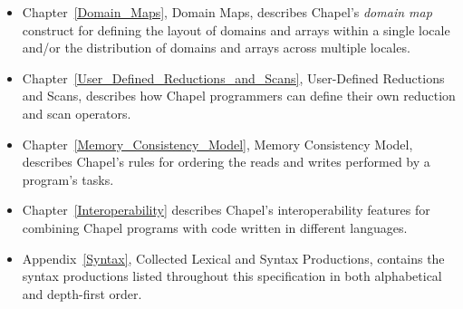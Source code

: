 \begin{itemize}
\item
Chapter~\ref{Domain_Maps}, Domain Maps, describes
Chapel's \emph{domain map} construct for defining the layout of
domains and arrays within a single locale and/or the distribution of
domains and arrays across multiple locales.

\item
Chapter~\ref{User_Defined_Reductions_and_Scans}, User-Defined
Reductions and Scans, describes how Chapel programmers can define
their own reduction and scan operators.

\item
  Chapter~\ref{Memory_Consistency_Model}, Memory Consistency Model,
  describes Chapel's rules for ordering the reads and writes performed
  by a program's tasks.

\item
Chapter~\ref{Interoperability} describes Chapel's interoperability
features for combining Chapel programs with code written in different
languages.

\item
Appendix~\ref{Syntax}, Collected Lexical and Syntax Productions,
contains the syntax productions listed throughout this specification
in both alphabetical and depth-first order.

\end{itemize}
